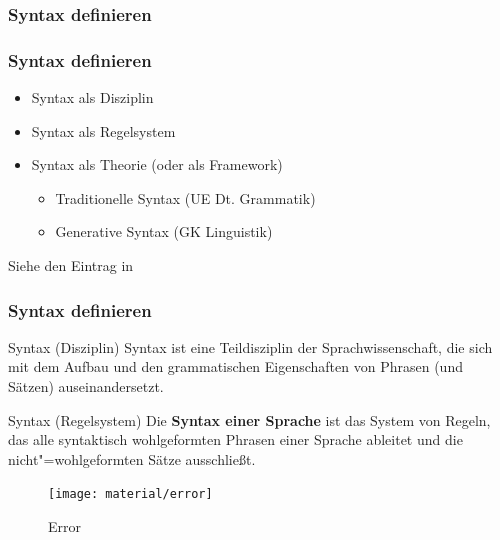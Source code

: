 \subsubsection{Syntax definieren}



\begin{frame}
\frametitle{Syntax definieren}

\begin{itemize}
	\item Syntax als Disziplin
	\item Syntax als Regelsystem
	\item Syntax als Theorie (oder als Framework)
	\begin{itemize}
		\item Traditionelle Syntax (\ras UE Dt. Grammatik)
		\item Generative Syntax (\ras GK Linguistik)
	\end{itemize}
\end{itemize}

Siehe den Eintrag  in \citet{Glueck&Roedel16a}

\end{frame}


\begin{frame}
\frametitle{Syntax definieren}

\begin{block}{Syntax (Disziplin)}
Syntax ist eine Teildisziplin der Sprachwissenschaft, die sich mit dem Aufbau und den grammatischen Eigenschaften von Phrasen (und Sätzen) auseinandersetzt.
\end{block}

\begin{block}{Syntax (Regelsystem)}
Die \textbf{Syntax einer Sprache} ist das System von Regeln, das alle syntaktisch wohlgeformten Phrasen einer Sprache ableitet und die nicht"=wohlgeformten Sätze ausschließt.
\end{block}

\end{frame}


\begin{frame}

\begin{figure}
\centering
	\texttt{[image: material/error]}
	\caption{Error}\label{Abb1}
\end{figure}

\end{frame}


